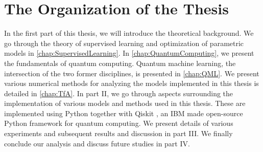 \section{The Organization of the Thesis}
In the first part of this thesis, we will introduce the theoretical background. We go through the theory of supervised learning and optimization of parametric models in \cref{chap:SupervisedLearning}. In \cref{chap:QuantumComputing}, we present the fundamentals of quantum computing. Quantum machine learning, the intersection of the two former disciplines, is presented in \cref{chap:QML}. We present various numerical methods for analyzing the models implemented in this thesis is detailed in \cref{chap:TfA}. In part II, we go through aspects surrounding the implementation of various models and methods used in this thesis. These are implemented using Python together with Qiskit \cite{Qiskit}, an IBM made open-source Python framework for quantum computing. We present details of various experiments and subsequent results and discussion in part III. We finally conclude our analysis and discuss future studies in part IV.

